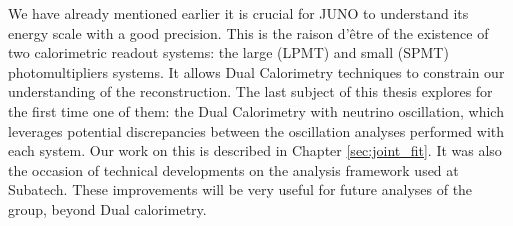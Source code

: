 \documentclass[../main.tex]{subfiles}
\begin{document}
\hfill

We have already mentioned earlier it is crucial for JUNO to understand its energy scale with a good precision. This is the raison d'être of the existence of two calorimetric readout systems: the large (LPMT) and small (SPMT) photomultipliers systems.
It allows Dual Calorimetry techniques to constrain our understanding of the reconstruction. The last subject of this thesis explores for the first time one of them: the Dual Calorimetry with neutrino oscillation,
which leverages potential discrepancies between the oscillation analyses performed with each system.
Our work on this is described in Chapter \ref{sec:joint_fit}.
It was also the occasion of technical developments on the analysis framework used at Subatech. These improvements will be very useful for future analyses of the group, beyond Dual calorimetry.
\end{document}
